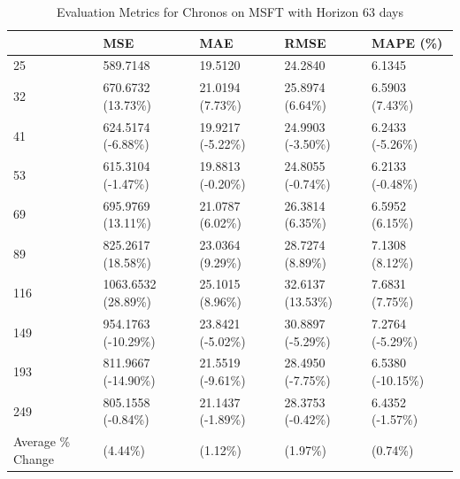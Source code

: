 \begin{table}
\caption{Evaluation Metrics for Chronos on MSFT with Horizon 63 days}
\label{tab:chronos_base_MSFT_h63_metrics}
\begin{tabular}{lllll}
\toprule
 & MSE & MAE & RMSE & MAPE (\%) \\
\midrule
25 & 589.7148 & 19.5120 & 24.2840 & 6.1345 \\
32 & 670.6732 (13.73\%) & 21.0194 (7.73\%) & 25.8974 (6.64\%) & 6.5903 (7.43\%) \\
41 & 624.5174 (-6.88\%) & 19.9217 (-5.22\%) & 24.9903 (-3.50\%) & 6.2433 (-5.26\%) \\
53 & 615.3104 (-1.47\%) & 19.8813 (-0.20\%) & 24.8055 (-0.74\%) & 6.2133 (-0.48\%) \\
69 & 695.9769 (13.11\%) & 21.0787 (6.02\%) & 26.3814 (6.35\%) & 6.5952 (6.15\%) \\
89 & 825.2617 (18.58\%) & 23.0364 (9.29\%) & 28.7274 (8.89\%) & 7.1308 (8.12\%) \\
116 & 1063.6532 (28.89\%) & 25.1015 (8.96\%) & 32.6137 (13.53\%) & 7.6831 (7.75\%) \\
149 & 954.1763 (-10.29\%) & 23.8421 (-5.02\%) & 30.8897 (-5.29\%) & 7.2764 (-5.29\%) \\
193 & 811.9667 (-14.90\%) & 21.5519 (-9.61\%) & 28.4950 (-7.75\%) & 6.5380 (-10.15\%) \\
249 & 805.1558 (-0.84\%) & 21.1437 (-1.89\%) & 28.3753 (-0.42\%) & 6.4352 (-1.57\%) \\
Average \% Change & (4.44\%) & (1.12\%) & (1.97\%) & (0.74\%) \\
\bottomrule
\end{tabular}
\end{table}
